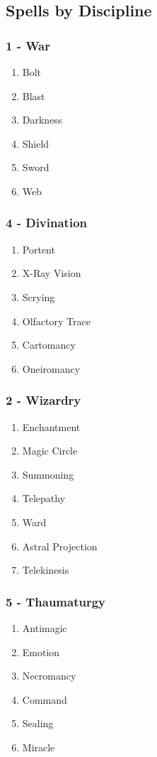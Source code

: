 \subsection{Spells by Discipline}
\label{sec:spell-list}
\begin{multicols}{3}
\subsubsection*{1 - War}
\begin{enumerate}
    \item {Bolt}
    \item {Blast}
    \item {Darkness}
    \item {Shield}
    \item {Sword}
    \item {Web}
\end{enumerate}
\subsubsection*{4 - Divination }
\begin{enumerate}
    \item {Portent}
    \item {X-Ray Vision}
    \item {Scrying}
    \item {Olfactory Trace}
    \item {Cartomancy}
    \item {Oneiromancy}
\end{enumerate}
\subsubsection*{2 - Wizardry}
\begin{enumerate}
    \item {Enchantment}
    \item {Magic Circle}
    \item {Summoning}
    \item {Telepathy}
    \item {Ward}
    \item {Astral Projection}
    \item {Telekinesis}
\end{enumerate}
\subsubsection*{5 - Thaumaturgy }
\begin{enumerate}
    \item {Antimagic}
    \item {Emotion}
    \item {Necromancy}
    \item {Command}
    \item {Sealing}
    \item {Miracle}
\end{enumerate}

\end{multicols}
